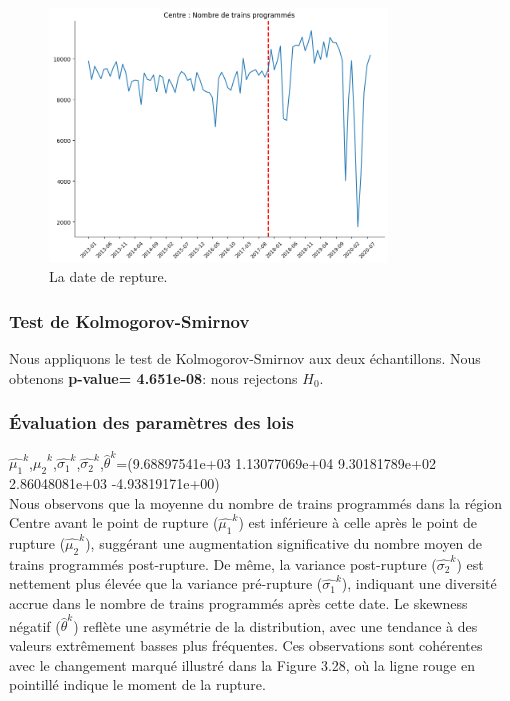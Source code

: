 {\begin{figure}[H]
\centering
\includegraphics[width=0.8\textwidth]{Cn-FIG04.png} 
\caption{La date de repture.}
\label{fig:trains_programmes_2}
\end{figure}

\subsubsection{Test de Kolmogorov-Smirnov}

Nous appliquons le test de Kolmogorov-Smirnov aux deux échantillons. Nous obtenons \textbf{p-value=  4.651e-08}: nous rejectons $H_0$.

\subsubsection{Évaluation des paramètres des lois}

$\hat{\mu_1}^k$,$\hat{\mu_2}^k$,$\hat{\sigma_1}^k$,$\hat{\sigma_2}^k$,$\hat{\theta}^k$=(9.68897541e+03  1.13077069e+04  9.30181789e+02  2.86048081e+03
 -4.93819171e+00)\\
 
Nous observons que la moyenne du nombre de trains programmés dans la région Centre avant le point de rupture ($\hat{\mu_1}^k$) est inférieure à celle après le point de rupture ($\hat{\mu_2}^k$), suggérant une augmentation significative du nombre moyen de trains programmés post-rupture. De même, la variance post-rupture ($\hat{\sigma_2}^k$) est nettement plus élevée que la variance pré-rupture ($\hat{\sigma_1}^k$), indiquant une diversité accrue dans le nombre de trains programmés après cette date. Le skewness négatif ($\hat{\theta}^k$) reflète une asymétrie de la distribution, avec une tendance à des valeurs extrêmement basses plus fréquentes. Ces observations sont cohérentes avec le changement marqué illustré dans la Figure 3.28, où la ligne rouge en pointillé indique le moment de la rupture.

}
